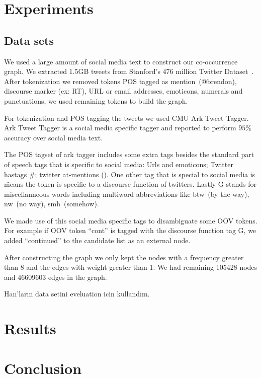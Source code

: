 \section{Experiments}
\label{sec:experiments}

\subsection{Data sets}

We used a large amount of social media text to construct our co-occurrence graph. We extracted 1.5GB tweets from Stanford's 476 million Twitter Dataset~\cite{DBLP:conf/wsdm/YangL11}. After tokenization we removed tokens POS tagged as mention~(@brendon), discourse marker (ex: RT), URL or email addresses, emoticons, numerals and punctuations, we used remaining tokens to build the graph.

For tokenization and POS tagging the tweets we used CMU Ark Tweet Tagger\cite{DBLP:conf/naacl/OwoputiODGSS13}\cite{Gimpel:2011:PTT:2002736.2002747}. Ark Tweet Tagger is a social media specific tagger and reported to perform $95\%$ accuracy over social media text.

The POS tagset of ark tagger includes some extra tags besides the standard part of speech tags that is specific to social media: Urls and emoticons; Twitter hastags \#; twitter at-mentions (\@). One other tag that is special to social media is \~ means the token is specific to a discourse function of twitters. Lastly G stands for miscellanneous words including multiword abbreviations like btw~(by the way), nw~(no way), smh~(somehow).

We made use of this social media specific tags to disambiguate some OOV tokens. For example if OOV token ``cont'' is tagged with the discourse function tag G, we added ``continued'' to the candidate list as an external node.

After constructing the graph we only kept the nodes with a frequency greater than 8 and the edges with weight greater than 1. We had remaining 105428 nodes and 46609603 edges in the graph.

Han'ların data setini eveluation icin kullandım.

\section{Results}


\section{Conclusion}
